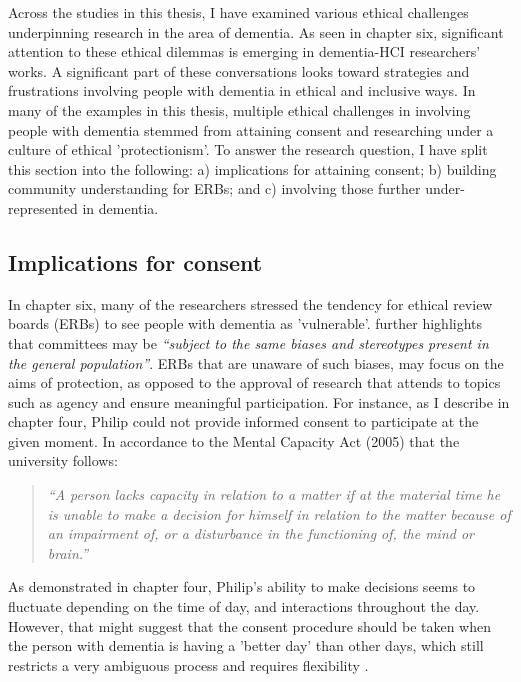 Across the studies in this thesis, I have examined various ethical challenges underpinning research in the area of dementia. As seen in chapter six, significant attention to these ethical dilemmas is emerging in dementia-HCI researchers' works. A significant part of these conversations looks toward strategies and frustrations involving people with dementia in ethical and inclusive ways. In many of the examples in this thesis, multiple ethical challenges in involving people with dementia stemmed from attaining consent and researching under a culture of ethical 'protectionism'. To answer the research question, I have split this section into the following: a) implications for attaining consent; b)  building community understanding for ERBs; and c) involving those further under-represented in dementia.

\subsection{Implications for consent}
\label{Cosent-Implications}
In chapter six, many of the researchers stressed the tendency for ethical review boards (ERBs) to see people with dementia as 'vulnerable'. \cite{pachana_can_2014} further highlights that committees may be \textit{``subject to the same biases and stereotypes present in the general population''}. ERBs that are unaware of such biases, may focus on the aims of protection, as opposed to the approval of research that attends to topics such as agency and ensure meaningful participation. For instance, as I describe in chapter four, Philip could not provide informed consent to participate at the given moment. In accordance to the Mental Capacity Act (2005) that the university follows:

\begin{quote}
\textit{``A person lacks capacity in relation to a matter if at the material time he is unable to make a decision for himself in relation to the matter because of an impairment of, or a disturbance in the functioning of, the mind or brain.''} \citep{oyebode_mental_2005}
\end{quote}

As demonstrated in chapter four, Philip's ability to make decisions seems to fluctuate depending on the time of day, and interactions throughout the day. However, that might suggest that the consent procedure should be taken when the person with dementia is having a 'better day' than other days, which still restricts a very ambiguous process and requires flexibility \citep{trachsel2015cognitive}. 

